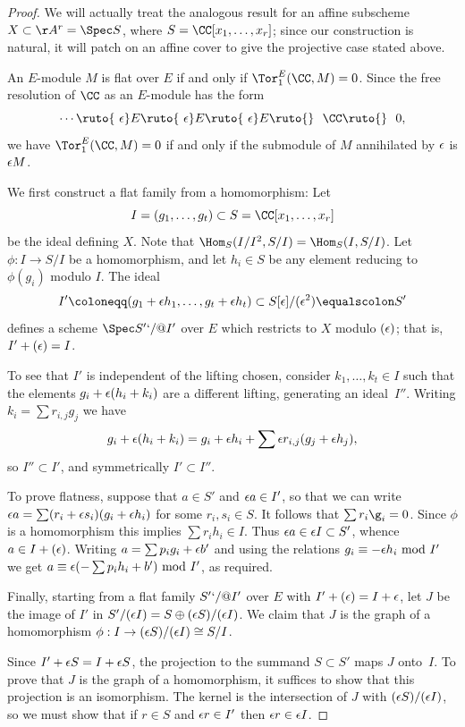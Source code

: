 \begin{proof}
We will actually treat the analogous result for an affine subscheme $X
\subset \AA^r = \Spec S$, where
$S = \CC[x_{1}, \dots, x_{r}]$; since our construction is natural,
it will patch on an affine cover to give the projective case stated above.

An $E$-module $M$ is flat
%
over $E$ if and only if $\Tor_1^E(\CC,M) = 0$.
Since the
free resolution
%
of $\CC$ as an $E$-module has the form
$$
\cdots \ruto {\ \eps} E \ruto {\ \eps} E \ruto {\ \eps} E
\ruto{}\ \ \CC \ruto{}\ \ 0,
$$
we have $\Tor_1^E(\CC,M)=0$ if and only if the submodule of $M$
annihilated by $\eps$ is $\eps M$.

We first construct a flat family from a homomorphism: Let
$$I = (g_1,\dots,
g_t)\subset S = \CC[x_1,\dots, x_r]
$$
be the ideal defining $X$.
Note that $\Hom_S(I/I^2, S/I) = \Hom_S(I,S/I)$. Let $\phi: I\to S/I$
be a homomorphism, and let $h_i\in S$ be
any element reducing to $\phi(g_i)$ modulo $I$.  The ideal
$$
I' \coloneqq  (g_1+\eps h_1,\dots, g_t+\eps h_t)\subset
S[\eps]/(\eps^2) \equalscolon S'
$$
defines a scheme $\Spec S'`/@I'$  over $E$ which restricts to $X$ modulo
$(\eps)$; that is, $I' +\nobreak (\eps) =\nobreak  I$.

To see that $I'$ is
independent of the lifting chosen,
consider
$k_1,\dots,k_t\in I$
such
that the elements $g_i+\eps(h_i+k_i)$ are a different lifting,
generating an ideal~$I''$.
Writing $k_i = \sum r_{i,j}g_j$ we have
$$
g_i+\eps(h_i+k_i) = g_i+\eps h_i+ \sum \eps r_{i,j}(g_j+\eps h_j)
,
$$
 so
$I'' \subset I'$, and symmetrically $I' \subset I''$.

To prove flatness, suppose that $a\in S'$ and  $\eps a  \in I'$,
so that we can write  $\eps a= \sum(r_i+\eps s_i)(g_i+\eps h_i)$ for
some $r_{i}, s_{i} \in S$.
It follows that
$\sum r_i\g_i = 0$. Since $\phi$ is a homomorphism this implies $\sum
r_i h_i \in I$. Thus
$\eps a \in  \eps I\subset S'$, whence $a\in I + (\eps)$.  Writing $a
=\sum p_i g_i+\eps b'$
and using the relations $g_i \equiv -\eps h_i \hbox{ mod } I'$ we get
 $a \equiv \eps (-\sum p_i h_i+b') \hbox{ mod } I'$, as required.

Finally, starting from a flat family $S'`/@I'$ over $E$ with $I' + (\eps)
= I +\eps$,
let $J$ be the image of $I'$ in $S'/(\eps I) = S \oplus (\eps S)/(\eps
I)$. We claim that $J$ is the graph of a homomorphism $\phi: I \to
(\eps S)/(\eps I) \cong S/I$.

Since $I' + \eps S = I +\eps S$,  the projection  to the  summand
$S\subset S'$ maps $J$ onto~$I$.
To prove that $J$ is the graph of a homomorphism, it suffices to show
that this projection is an isomorphism.
The kernel is
the intersection of $J$ with $(\eps S)/(\eps I )$, so we must show that
if $r\in S$ and $\eps r \in I'$ then $\eps r \in \eps I$.


\end{proof}
